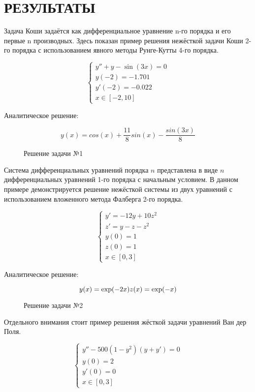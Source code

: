 \section{РЕЗУЛЬТАТЫ}

Задача Коши задаётся как дифференциальное уравнение n-го порядка и его первые n производных. Здесь показан пример решения нежёсткой
задачи Коши 2-го порядка с использованием явного методы Рунге-Кутты 4-го порядка.

$$
\begin{cases}
	y'' + y - \sin(3x) = 0\\
	y(-2) = -1.701\\
	y'(-2) = -0.022\\
	x \in [-2, 10]
\end{cases}
$$

Аналитическое решение:

$$
y(x) = cos(x) + \dfrac{11}{8}sin(x) - \dfrac{sin(3x)}{8}
$$

\begin{figure}
    
    \caption{Решение задачи №1}
    \label{fig:task1}
\end{figure}

Система дифференциальных уравнений порядка $n$ представлена в виде $n$ дифференциальных уравнений 1-го порядка с начальным условием. В
данном примере демонстрируется решение нежёсткой системы из двух уравнений с использованием вложенного метода Фалберга 2-го порядка.

$$
\begin{cases}
    y' = -12y + 10z^2\\
    z' = y - z - z^2\\
    y(0) = 1\\
    z(0) = 1\\
    x \in [0, 3]
\end{cases}
$$

Аналитическое решение:

$$
y(x) = \exp(-2x)\\
z(x) = \exp(-x)
$$

\begin{figure}
    
    \caption{Решение задачи №2}
    \label{fig:task2}
\end{figure}

Отдельного внимания стоит пример решения жёсткой задачи уравнений Ван дер Поля.

$$
\begin{cases}
    y'' - 500(1 - y^2)(y + y') = 0\\
    y(0) = 2\\
    y'(0) = 0\\
    x \in [0, 3]
\end{cases}
$$

